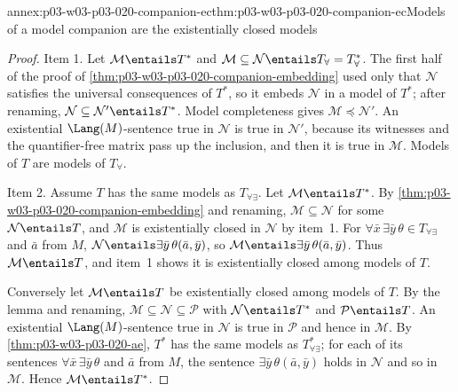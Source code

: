 \begin{annexitem}{annex:p03-w03-p03-020-companion-ec}{thm:p03-w03-p03-020-companion-ec}{Models of a model companion are the existentially closed models}
\begin{proof}
Item 1. Let \(\mathcal M\entails T^*\) and
\(\mathcal M\subseteq\mathcal N\entails T_\forall=T^*_\forall\). The first
half of the proof of \cref{thm:p03-w03-p03-020-companion-embedding} used
only that \(\mathcal N\) satisfies the universal consequences of \(T^*\),
so it embeds \(\mathcal N\) in a model of \(T^*\); after renaming,
\(\mathcal N\subseteq\mathcal N'\entails T^*\). Model completeness gives
\(\mathcal M\preccurlyeq\mathcal N'\). An existential
\(\Lang(M)\)-sentence true in \(\mathcal N\) is true in \(\mathcal N'\),
because its witnesses and the quantifier-free matrix pass up the inclusion,
and then it is true in \(\mathcal M\). Models of \(T\) are models of
\(T_\forall\).

Item 2. Assume \(T\) has the same models as \(T_{\forall\exists}\).
Let \(\mathcal M\entails T^*\). By
\cref{thm:p03-w03-p03-020-companion-embedding} and renaming,
\(\mathcal M\subseteq\mathcal N\) for some \(\mathcal N\entails T\), and
\(\mathcal M\) is existentially closed in \(\mathcal N\) by item~1. For
\(\forall\bar x\,\exists\bar y\,\theta\in T_{\forall\exists}\) and \(\bar a\)
from \(M\), \(\mathcal N\entails\exists\bar y\,\theta(\bar a,\bar y)\), so
\(\mathcal M\entails\exists\bar y\,\theta(\bar a,\bar y)\). Thus
\(\mathcal M\entails T\), and item~1 shows it is existentially closed among
models of \(T\).

Conversely let \(\mathcal M\entails T\) be existentially closed among models
of \(T\). By the lemma and renaming,
\(\mathcal M\subseteq\mathcal N\subseteq\mathcal P\) with
\(\mathcal N\entails T^*\) and \(\mathcal P\entails T\). An existential
\(\Lang(M)\)-sentence true in \(\mathcal N\) is true in \(\mathcal P\) and
hence in \(\mathcal M\). By \cref{thm:p03-w03-p03-020-ae}, \(T^*\) has
the same models as \(T^*_{\forall\exists}\); for each of its sentences
\(\forall\bar x\,\exists\bar y\,\theta\) and \(\bar a\) from \(M\), the
sentence \(\exists\bar y\,\theta(\bar a,\bar y)\) holds in \(\mathcal N\) and
so in \(\mathcal M\). Hence \(\mathcal M\entails T^*\).
\end{proof}
\end{annexitem}

